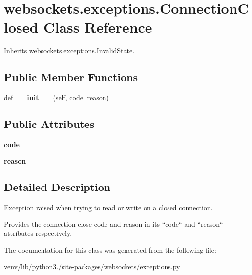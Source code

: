 \hypertarget{classwebsockets_1_1exceptions_1_1_connection_closed}{}\section{websockets.\+exceptions.\+Connection\+Closed Class Reference}
\label{classwebsockets_1_1exceptions_1_1_connection_closed}


Inherits \hyperlink{classwebsockets_1_1exceptions_1_1_invalid_state}{websockets.\+exceptions.\+Invalid\+State}.

\subsection*{Public Member Functions}
\begin{DoxyCompactItemize}
\item 
\mbox{\label{classwebsockets_1_1exceptions_1_1_connection_closed_adff0fe0ca3489c025524be7462e86fa7}} 
def {\bfseries \+\_\+\+\_\+init\+\_\+\+\_\+} (self, code, reason)
\end{DoxyCompactItemize}
\subsection*{Public Attributes}
\begin{DoxyCompactItemize}
\item 
\mbox{\label{classwebsockets_1_1exceptions_1_1_connection_closed_a399439645251d0d6c08a1b3ba15af983}} 
{\bfseries code}
\item 
\mbox{\label{classwebsockets_1_1exceptions_1_1_connection_closed_a734d70cf5997636a373ff07216ae5fa9}} 
{\bfseries reason}
\end{DoxyCompactItemize}


\subsection{Detailed Description}
\begin{DoxyVerb}Exception raised when trying to read or write on a closed connection.

Provides the connection close code and reason in its ``code`` and
``reason`` attributes respectively.\end{DoxyVerb}
 

The documentation for this class was generated from the following file\+:\begin{DoxyCompactItemize}
\item 
venv/lib/python3./site-\/packages/websockets/exceptions.\+py\end{DoxyCompactItemize}
